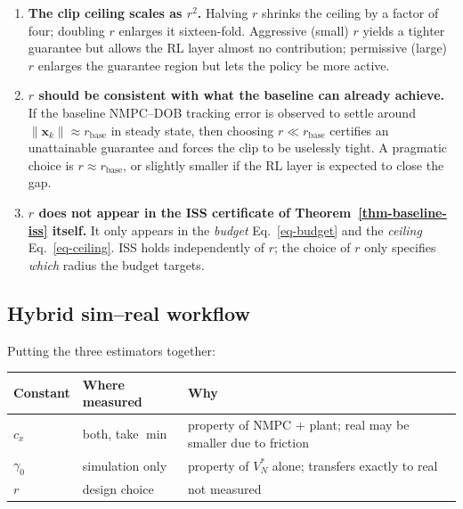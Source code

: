 \documentclass[
  11pt,
]{article}
\newcounter{none} %
\theoremstyle{plain}
\theoremstyle{plain}
\theoremstyle{definition}
\theoremstyle{remark}
\begin{document}
\begin{enumerate}
\def\labelenumi{\arabic{enumi}.}
\item
  \textbf{The clip ceiling scales as \(r^2\).} Halving \(r\) shrinks the
  ceiling by a factor of four; doubling \(r\) enlarges it sixteen-fold.
  Aggressive (small) \(r\) yields a tighter guarantee but allows the RL
  layer almost no contribution; permissive (large) \(r\) enlarges the
  guarantee region but lets the policy be more active.
\item
  \textbf{\(r\) should be consistent with what the baseline can already
  achieve.} If the baseline NMPC--DOB tracking error is observed to
  settle around \(\|\bm{x}_k\| \approx r_{\mathrm{base}}\) in steady
  state, then choosing \(r \ll r_{\mathrm{base}}\) certifies an
  unattainable guarantee and forces the clip to be uselessly tight. A
  pragmatic choice is \(r \approx r_{\mathrm{base}}\), or slightly
  smaller if the RL layer is expected to close the gap.
\item
  \textbf{\(r\) does not appear in the ISS certificate of
  Theorem~\ref{thm-baseline-iss} itself.} It only appears in the
  \emph{budget} Eq.~\ref{eq-budget} and the \emph{ceiling}
  Eq.~\ref{eq-ceiling}. ISS holds independently of \(r\); the choice of
  \(r\) only specifies \emph{which} radius the budget targets.
\end{enumerate}

\subsection{Hybrid sim--real workflow}\label{sec-estim-flow}

Putting the three estimators together:

{\def\LTcaptype{none} %
\begin{longtable}[]{@{}
  >{\raggedright\arraybackslash}p{}
  >{\raggedright\arraybackslash}p{}
  >{\raggedright\arraybackslash}p{}@{}}
\toprule\noalign{}
\begin{minipage}[b]{\linewidth}\raggedright
Constant
\end{minipage} & \begin{minipage}[b]{\linewidth}\raggedright
Where measured
\end{minipage} & \begin{minipage}[b]{\linewidth}\raggedright
Why
\end{minipage} \\
\midrule\noalign{}
\endhead
\bottomrule\noalign{}
\endlastfoot
\(c_x\) & both, take \(\min\) & property of NMPC + plant; real may be
smaller due to friction \\
\(\gamma_0\) & simulation only & property of \(V_N^*\) alone; transfers
exactly to real \\
\(r\) & design choice & not measured \\
\end{longtable}
}
\end{document}
